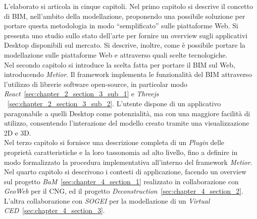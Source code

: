 L'elaborato si articola in cinque capitoli.
Nel primo capitolo si descrive il concetto di BIM, nell’ambito della modellazione, proponendo una possibile soluzione
per portare questa metodologia in modo ``semplificato'' sulle piattaforme Web.
Si presenta uno studio sullo stato dell’arte per fornire un overview
sugli applicativi Desktop disponibili sul mercato. Si descrive, inoltre, come è
possibile portare la modellazione sulle piattaforme Web e attraverso quali scelte tecnologiche.\\
Nel secondo capitolo si introduce la scelta fatta per portare il BIM sul Web, introducendo \emph{Metior}.
Il framework implementa le funzionalità del BIM attraverso l'utilizzo di librerie software open-source,
in particolar modo \emph{React}~\ref{sec:chapter_2_section_3_sub_1} e \emph{Threejs} ~\ref{sec:chapter_2_section_3_sub_2}.
L'utente dispone di un applicativo paragonabile a quelli
Desktop come potenzialità, ma con una maggiore facilità di utilizzo, consentendo l'interazione del modello creato
tramite una visualizzazione 2D e 3D.\\
Nel terzo capitolo si fornisce una descrizione completa di un \emph{Plugin} delle
proprietà caratteristiche e la loro tassonomia ad alto livello, fino a definire in modo formalizzato
la procedura implementativa all'interno del framework \emph{Metior}.\\
Nel quarto capitolo si descrivono i contesti di applicazione, facendo un overview sul
progetto \emph{BaM}~\ref{sec:chapter_4_section_1} realizzato in collaborazione con \emph{GeoWeb} per il CNG,
ed il progetto \emph{Deconstruction}~\ref{sec:chapter_4_section_2}.
L'altra collaborazione con \emph{SOGEI} per la modellazione di un \emph{Virtual CED}~\ref{sec:chapter_4_section_3}.
